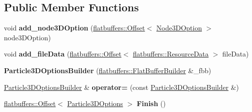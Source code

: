 \subsection*{Public Member Functions}
\begin{DoxyCompactItemize}
\item 
\mbox{\label{structflatbuffers_1_1Particle3DOptionsBuilder_ad49ba3eb57762e78e004907132e2793c}} 
void {\bfseries add\+\_\+node3\+D\+Option} (\hyperlink{structflatbuffers_1_1Offset}{flatbuffers\+::\+Offset}$<$ \hyperlink{structflatbuffers_1_1Node3DOption}{Node3\+D\+Option} $>$ node3\+D\+Option)
\item 
\mbox{\label{structflatbuffers_1_1Particle3DOptionsBuilder_a2d0c015cf5b8955eb910e37816a026ad}} 
void {\bfseries add\+\_\+file\+Data} (\hyperlink{structflatbuffers_1_1Offset}{flatbuffers\+::\+Offset}$<$ \hyperlink{structflatbuffers_1_1ResourceData}{flatbuffers\+::\+Resource\+Data} $>$ file\+Data)
\item 
\mbox{\label{structflatbuffers_1_1Particle3DOptionsBuilder_a48788ed00c3d1b90f186557e0541bab7}} 
{\bfseries Particle3\+D\+Options\+Builder} (\hyperlink{classflatbuffers_1_1FlatBufferBuilder}{flatbuffers\+::\+Flat\+Buffer\+Builder} \&\+\_\+fbb)
\item 
\mbox{\label{structflatbuffers_1_1Particle3DOptionsBuilder_a288812f6e9de41bf4872dabdafcf65f5}} 
\hyperlink{structflatbuffers_1_1Particle3DOptionsBuilder}{Particle3\+D\+Options\+Builder} \& {\bfseries operator=} (const \hyperlink{structflatbuffers_1_1Particle3DOptionsBuilder}{Particle3\+D\+Options\+Builder} \&)
\item 
\mbox{\label{structflatbuffers_1_1Particle3DOptionsBuilder_abf47c5920ff52ddefd21456658f4dbe1}} 
\hyperlink{structflatbuffers_1_1Offset}{flatbuffers\+::\+Offset}$<$ \hyperlink{structflatbuffers_1_1Particle3DOptions}{Particle3\+D\+Options} $>$ {\bfseries Finish} ()
\item 
\mbox{\label{structflatbuffers_1_1Particle3DOptionsBuilder_ad49ba3eb57762e78e004907132e2793c}} 

\end{DoxyCompactItemize}

